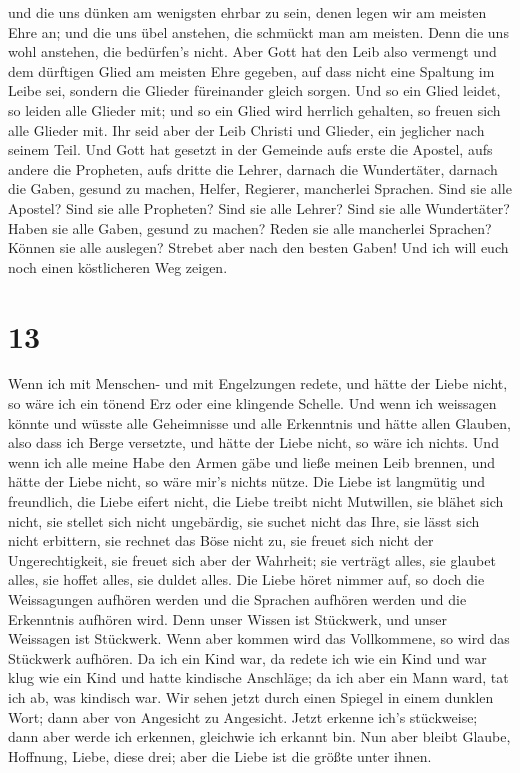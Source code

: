  und die uns dünken am wenigsten ehrbar zu sein, denen
legen wir am meisten Ehre an; und die uns übel anstehen, die schmückt
man am meisten.  Denn die uns wohl anstehen, die
bedürfen's nicht. Aber Gott hat den Leib also vermengt und dem dürftigen
Glied am meisten Ehre gegeben,  auf dass nicht eine
Spaltung im Leibe sei, sondern die Glieder füreinander gleich sorgen.
 Und so ein Glied leidet, so leiden alle Glieder mit; und
so ein Glied wird herrlich gehalten, so freuen sich alle Glieder mit.
 Ihr seid aber der Leib Christi und Glieder, ein
jeglicher nach seinem Teil.  Und Gott hat gesetzt in der
Gemeinde aufs erste die Apostel, aufs andere die Propheten, aufs dritte
die Lehrer, darnach die Wundertäter, darnach die Gaben, gesund zu
machen, Helfer, Regierer, mancherlei Sprachen.  Sind sie
alle Apostel? Sind sie alle Propheten? Sind sie alle Lehrer? Sind sie
alle Wundertäter?  Haben sie alle Gaben, gesund zu
machen? Reden sie alle mancherlei Sprachen? Können sie alle auslegen?
 Strebet aber nach den besten Gaben! Und ich will euch
noch einen köstlicheren Weg zeigen.

\hypertarget{section-12}{%
\section{13}\label{section-12}}

 Wenn ich mit Menschen- und mit Engelzungen redete, und
hätte der Liebe nicht, so wäre ich ein tönend Erz oder eine klingende
Schelle.  Und wenn ich weissagen könnte und wüsste alle
Geheimnisse und alle Erkenntnis und hätte allen Glauben, also dass ich
Berge versetzte, und hätte der Liebe nicht, so wäre ich nichts.
 Und wenn ich alle meine Habe den Armen gäbe und ließe
meinen Leib brennen, und hätte der Liebe nicht, so wäre mir's nichts
nütze.  Die Liebe ist langmütig und freundlich, die Liebe
eifert nicht, die Liebe treibt nicht Mutwillen, sie blähet sich nicht,
 sie stellet sich nicht ungebärdig, sie suchet nicht das
Ihre, sie lässt sich nicht erbittern, sie rechnet das Böse nicht zu,
 sie freuet sich nicht der Ungerechtigkeit, sie freuet
sich aber der Wahrheit;  sie verträgt alles, sie glaubet
alles, sie hoffet alles, sie duldet alles.  Die Liebe
höret nimmer auf, so doch die Weissagungen aufhören werden und die
Sprachen aufhören werden und die Erkenntnis aufhören wird.
 Denn unser Wissen ist Stückwerk, und unser Weissagen ist
Stückwerk.  Wenn aber kommen wird das Vollkommene, so
wird das Stückwerk aufhören.  Da ich ein Kind war, da
redete ich wie ein Kind und war klug wie ein Kind und hatte kindische
Anschläge; da ich aber ein Mann ward, tat ich ab, was kindisch war.
 Wir sehen jetzt durch einen Spiegel in einem dunklen
Wort; dann aber von Angesicht zu Angesicht. Jetzt erkenne ich's
stückweise; dann aber werde ich erkennen, gleichwie ich erkannt bin.
 Nun aber bleibt Glaube, Hoffnung, Liebe, diese drei;
aber die Liebe ist die größte unter ihnen.

